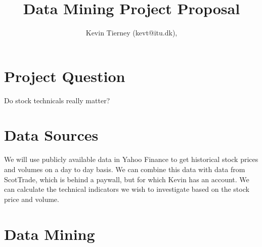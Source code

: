 \documentclass[11pt]{article}
\begin{document}
\title{Data Mining Project Proposal}
\author{Kevin Tierney  (kevt@itu.dk), }

\maketitle

\section{Project Question}

Do stock technicals really matter?

\section{Data Sources}

We will use publicly available data in Yahoo Finance to get historical stock
prices and volumes on a day to day basis. We can combine this data with data
from ScotTrade, which is behind a paywall, but for which Kevin has an account.
We can calculate the technical indicators we wish to investigate based on the
stock price and volume.

\section{Data Mining}
\end{document}
